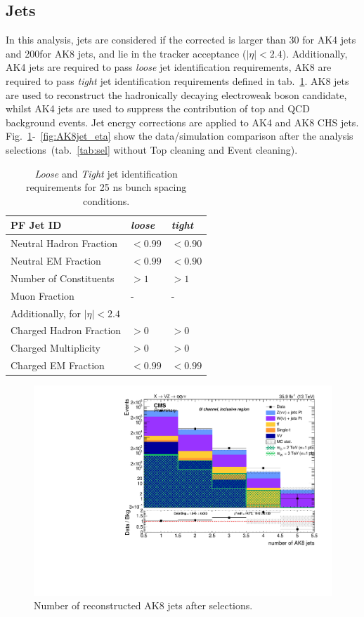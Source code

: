\subsection{Jets}\label{ssec:jets}
In this analysis, jets are considered if the corrected \pt is larger than 30 \GeV for AK4 jets and 200\GeV for AK8 jets, and lie in the tracker acceptance ($|\eta|<2.4$). Additionally, AK4 jets are required to pass \emph{loose} jet identification requirements, AK8 are required to pass \emph{tight} jet identification requirements defined in tab.~\ref{tab:JetId}. AK8 jets are used to reconstruct the hadronically decaying electroweak boson candidate, whilst AK4 jets are used to suppress the contribution of top and QCD background events. Jet energy corrections are applied to AK4 and AK8 CHS jets. Fig.~\ref{fig:n_AK8}-~\ref{fig:AK8jet_eta} show the data/simulation comparison after the analysis selections~(tab.~\ref{tab:sel} without Top cleaning and Event cleaning).

\begin{table}[htb]
 \centering
 \begin{tabular}{lll}
\hline
PF Jet ID                       & \emph{loose}   & \emph{tight}   \\
\hline
Neutral Hadron Fraction         & $< 0.99  $     & $< 0.90  $    \\
Neutral EM Fraction             & $< 0.99  $     & $< 0.90  $\\
Number of Constituents          & $> 1     $     & $> 1     $\\
Muon Fraction                   & \--            & \-- \\
\hline
\multicolumn{3}{l}{Additionally, for $|\eta| < 2.4$ } \\
\hline
Charged Hadron Fraction         & $> 0   $& $> 0   $\\
Charged Multiplicity            & $> 0   $& $> 0   $\\
Charged EM Fraction             & $< 0.99$& $< 0.99$\\
\hline
 \end{tabular}
 \caption{ \emph{Loose} and \emph{Tight} jet identification requirements for 25 ns bunch spacing conditions.\label{tab:JetId}}
\end{table}

\begin{figure}[!htb]
  \begin{center}
    \includegraphics[width=.495\textwidth]{plots/v9_U/XVZnnInc/nFatJets.pdf}
  \end{center}
  \caption{Number of reconstructed AK8 jets after selections.}
  \label{fig:n_AK8}
\end{figure}

